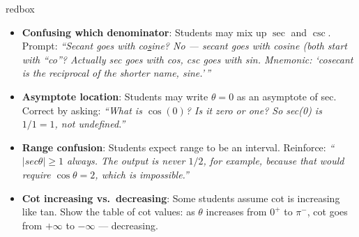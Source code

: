 \documentclass[10pt]{article}
\begin{document}
\vspace{0.08in}

\begin{skillbox}{redbox}
\begin{itemize}[leftmargin=1.4em, itemsep=3pt]
  \item \textbf{Confusing which denominator}: Students may mix up $\sec$ and $\csc$.
    Prompt: \textit{``Secant goes with co\underline{s}ine? No --- secant goes with
    cosine (both start with ``co''? Actually sec goes with cos, csc goes with sin.
    Mnemonic: `cosecant is the reciprocal of the shorter name, sine.'\,''}
  \item \textbf{Asymptote location}: Students may write $\theta = 0$ as an asymptote
    of sec. Correct by asking: \textit{``What is $\cos(0)$? Is it zero or one?
    So sec(0) is $1/1 = 1$, not undefined.''}
  \item \textbf{Range confusion}: Students expect range to be an interval.
    Reinforce: \textit{``$|sec\theta| \geq 1$ always. The output is never $1/2$,
    for example, because that would require $\cos\theta = 2$, which is impossible.''}
  \item \textbf{Cot increasing vs.\ decreasing}: Some students assume cot is
    increasing like tan. Show the table of cot values: as $\theta$ increases from
    $0^+$ to $\pi^-$, cot goes from $+\infty$ to $-\infty$ --- decreasing.
\end{itemize}
\end{skillbox}

\vspace{0.08in}
\end{document}

